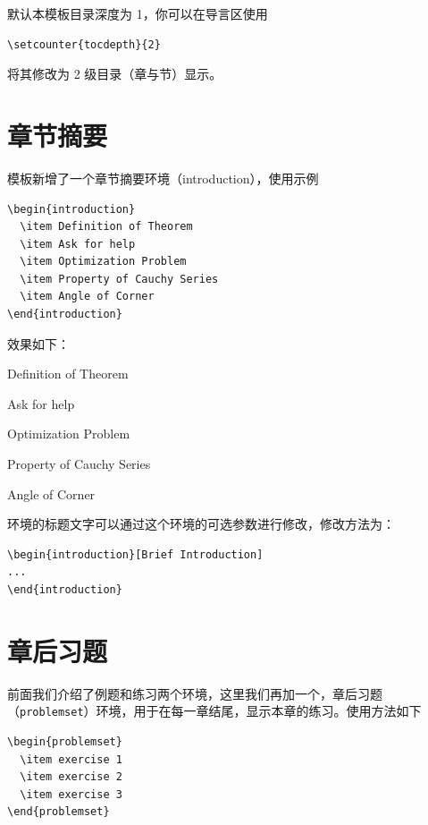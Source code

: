 \documentclass[lang=cn,10pt,cite=super]{elegantbook}
\begin{document}
默认本模板目录深度为 1，你可以在导言区使用
\begin{lstlisting}
\setcounter{tocdepth}{2}
\end{lstlisting}
将其修改为 2 级目录（章与节）显示。


\section{章节摘要}
模板新增了一个章节摘要环境（introduction），使用示例
\begin{lstlisting}
\begin{introduction}
  \item Definition of Theorem
  \item Ask for help
  \item Optimization Problem
  \item Property of Cauchy Series
  \item Angle of Corner
\end{introduction}
\end{lstlisting}
效果如下：
\begin{introduction}
  \item Definition of Theorem
  \item Ask for help
  \item Optimization Problem
  \item Property of Cauchy Series
  \item Angle of Corner
\end{introduction}

环境的标题文字可以通过这个环境的可选参数进行修改，修改方法为：
\begin{lstlisting}
\begin{introduction}[Brief Introduction]
...
\end{introduction}
\end{lstlisting}

\section{章后习题}
前面我们介绍了例题和练习两个环境，这里我们再加一个，章后习题（\lstinline{problemset}）环境，用于在每一章结尾，显示本章的练习。使用方法如下

\begin{lstlisting}
\begin{problemset}
  \item exercise 1
  \item exercise 2
  \item exercise 3
\end{problemset}
\end{lstlisting}
\end{document}
